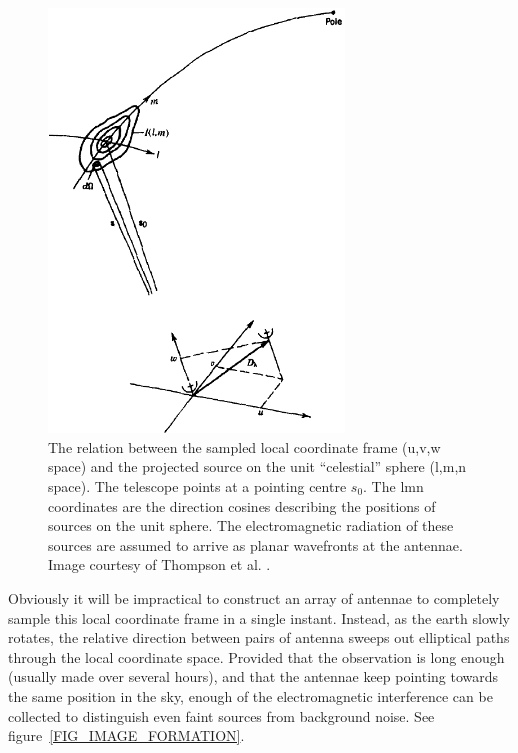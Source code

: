 \documentclass[a4paper, two column]{article}
\begin{document}
\begin{figure}[h]
 \begin{mdframed}
 \centering
 \includegraphics[width=0.7\textwidth]{lmn_uvw.png}
 \caption[The relation between image space and visibilities]{The relation between the sampled local coordinate frame (u,v,w space) and the projected source on the unit ``celestial'' 
 sphere (l,m,n space). The telescope points at a pointing centre $s_0$. The lmn coordinates are the direction cosines describing the positions of sources on the unit sphere. The electromagnetic radiation
 of these sources are assumed to arrive as planar wavefronts at the antennae. Image courtesy of Thompson et al. \cite{thompson2008interferometry}.}
  \label{FIG_APERTURE_SYNTH}
 \end{mdframed}
\end{figure}

Obviously it will be impractical to construct an array of antennae to completely sample this local coordinate frame in a single instant. Instead, as the earth slowly rotates, the 
relative direction between pairs of antenna sweeps out elliptical paths through the local coordinate space. Provided that the observation is long enough (usually made over several hours), 
and that the antennae keep pointing towards the same position in the sky, enough of the electromagnetic interference can be collected to distinguish even faint sources from 
background noise. See figure~\ref{FIG_IMAGE_FORMATION}.
\end{document}
